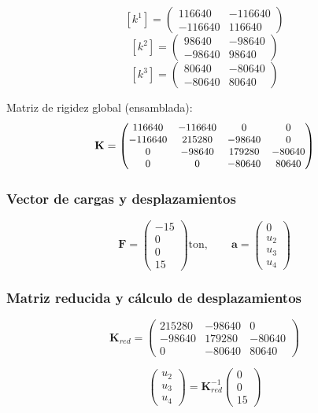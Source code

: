 \documentclass[conference]{IEEEtran}
\begin{document}
\[
[k^1]=\begin{pmatrix}116640&-116640\\-116640&116640\end{pmatrix}
\]
\[
[k^2]=\begin{pmatrix}98640&-98640\\-98640&98640\end{pmatrix}
\]
\[
[k^3]=\begin{pmatrix}80640&-80640\\-80640&80640\end{pmatrix}
\]

Matriz de rigidez global (ensamblada):
\[
{\small
\mathbf{K}=
\begin{pmatrix}
116640 & -116640 & 0 & 0\\
-116640 & 215280 & -98640 & 0\\
0 & -98640 & 179280 & -80640\\
0 & 0 & -80640 & 80640
\end{pmatrix}}
\]

\subsubsection*{Vector de cargas y desplazamientos}

\[
\mathbf{F}=\begin{pmatrix}-15\\0\\0\\15\end{pmatrix}\text{ton},\qquad
\mathbf{a}=\begin{pmatrix}0\\u_2\\u_3\\u_4\end{pmatrix}
\]

\subsubsection*{Matriz reducida y cálculo de desplazamientos}

\[
\mathbf{K}_{red}=
\begin{pmatrix}
215280 & -98640 & 0\\
-98640 & 179280 & -80640\\
0 & -80640 & 80640
\end{pmatrix}
\]

\[
\begin{pmatrix}u_2\\u_3\\u_4\end{pmatrix}=\mathbf{K}_{red}^{-1}\begin{pmatrix}0\\0\\15\end{pmatrix}
\]
\end{document}
